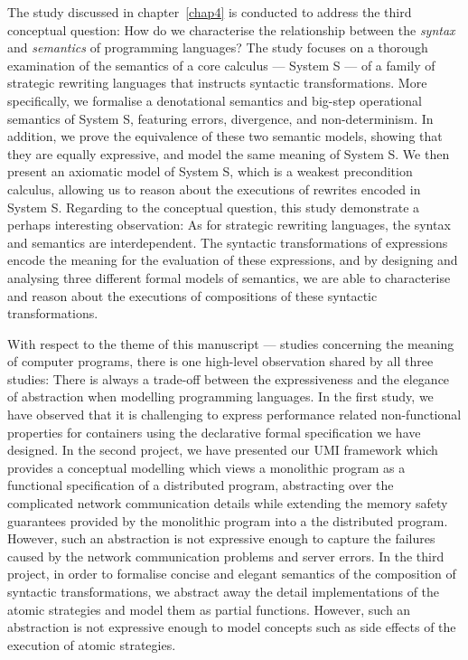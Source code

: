 The study discussed in chapter~\ref{chap4} is conducted to address the third conceptual question: How do we characterise the relationship between the \emph{syntax} and \emph{semantics} of programming languages? The study focuses on a thorough examination of the semantics of a core calculus --- System S --- of a family of strategic rewriting languages that instructs syntactic transformations. More specifically, we formalise a denotational semantics and big-step operational semantics of System S, featuring errors, divergence, and non-determinism. In addition, we prove the equivalence of these two semantic models, showing that they are equally expressive, and model the same meaning of System S. We then present an axiomatic model of System S, which is a weakest precondition calculus, allowing us to reason about the executions of rewrites encoded in System S. Regarding to the conceptual question, this study demonstrate a perhaps interesting observation: As for strategic rewriting languages, the syntax and semantics are interdependent. The syntactic transformations of expressions encode the meaning for the evaluation of these expressions, and by designing and analysing three different formal models of semantics, we are able to characterise and reason about the executions of compositions of these syntactic transformations.

With respect to the theme of this manuscript --- studies concerning the meaning of computer programs, there is one high-level observation shared by all three studies: There is always a trade-off between the expressiveness and the elegance of abstraction when modelling programming languages. In the first study, we have observed that it is challenging to express performance related non-functional properties for containers using the declarative formal specification we have designed. In the second project, we have presented our UMI framework which provides a conceptual modelling which views a monolithic program as a functional specification of a distributed program, abstracting over the complicated network communication details while extending the memory safety guarantees provided by the monolithic program into a the distributed program. However, such an abstraction is not expressive enough to capture the failures caused by the network communication problems and server errors. In the third project, in order to formalise concise and elegant semantics of the composition of syntactic transformations, we abstract away the detail implementations of the atomic strategies and model them as partial functions. However, such an abstraction is not expressive enough to model concepts such as side effects of the execution of atomic strategies. 

